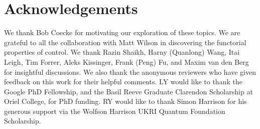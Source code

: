 \section{Acknowledgements}
We thank Bob Coecke for motivating our exploration of these topics. We are grateful to all the collaboration with Matt Wilson in discovering the functorial properties of control. We thank Razin Shaikh, Harny (Quanlong) Wang, Itai Leigh, Tim Forrer, Aleks Kissinger, Frank (Peng) Fu, and Maxim van den Berg for insightful discussions. We also thank the anonymous reviewers who have given feedback on this work for their helpful comments.
LY would like to thank the Google PhD Fellowship, and the Basil Reeve Graduate Clarendon Scholarship at Oriel College, for PhD funding.
RY would like to thank Simon Harrison for his generous support via the Wolfson Harrison UKRI Quantum Foundation Scholarship.